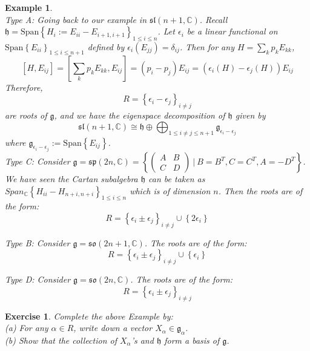 \documentclass[11pt]{book}
\newtheorem{example}[theorem]{Example}
\newtheorem{exercise}[theorem]{Exercise}
\newcommand{\bb}[1]{\mathbb{#1}}
\newcommand{\mf}[1]{\mathfrak{#1}}
\begin{document}
\begin{example} \mbox{}\\
Type A: Going back to our example in $\mf{sl}(n+1,\bb{C})$. Recall $\mf{h} = \mathrm{Span}\left\{H_i := E_{ii} - E_{i+1,i+1}\right\}_{1\leq i \leq n}$. Let $\epsilon_{i}$ be a linear functional on $\mathrm{Span}\left\{E_{ii}\right\}_{1 \leq i \leq n+1}$ defined by $\epsilon_i(E_{jj}) = \delta_{ij}$. Then for any $H = \sum_k p_kE_{kk}$,
$$[H,E_{ij}] = [\sum_k p_kE_{kk}, E_{ij}] = (p_i - p_j)E_{ij} = (\epsilon_i(H) - \epsilon_j(H))E_{ij}$$
Therefore,
$$R = \left\{ \epsilon_i - \epsilon_j \right\}_{i \neq j}$$
are roots of $\mf{g}$, and we have the eigenspace decomposition of $\mf{h}$ given by
$$\mf{sl}(n+1,\bb{C}) \cong \mf{h} \oplus \bigoplus_{1\leq i \neq j \leq n+1} \mf{g}_{\epsilon_i - \epsilon_j}$$
where $\mf{g}_{\epsilon_i - \epsilon_j} := \mathrm{Span}\left\{E_{ij}\right\}$.\\

\noindent Type C: Consider $\mf{g} = \mf{sp}(2n,\bb{C}) = \left\{ \left( \begin{array}{cc}
A & B \\
C & D \end{array} \right)\ \Big|\ B = B^T, C = C^T, A = -D^T \right\}$. We have seen the Cartan subalgebra $\mf{h}$ can be taken as $Span_{\bb{C}}\left\{H_{ii} - H_{n+i, n+i}\right\}_{1 \leq i \leq n}$ which is of dimension $n$. Then the roots are of the form:
$$R = \left\{ \epsilon_i \pm \epsilon_j \right\}_{i \neq j} \cup \left\{2\epsilon_i\right\}$$

\noindent Type B: Consider $\mf{g} = \mf{so}(2n+1,\bb{C})$. The roots are of the form:
$$R = \left\{ \epsilon_i \pm \epsilon_j \right\}_{i \neq j} \cup \left\{\epsilon_i\right\}$$

\noindent Type D: Consider $\mf{g} = \mf{so}(2n,\bb{C})$. The roots are of the form:
$$R = \left\{ \epsilon_i \pm \epsilon_j \right\}_{i \neq j}$$
\end{example}

\begin{exercise}
Complete the above Example by:\\
(a) For any $\alpha \in R$, write down a vector $X_{\alpha} \in \mf{g}_{\alpha}$.\\
(b) Show that the collection of $X_{\alpha}$'s and $\mf{h}$ form a basis of $\mf{g}$.
\end{exercise}
\end{document}
